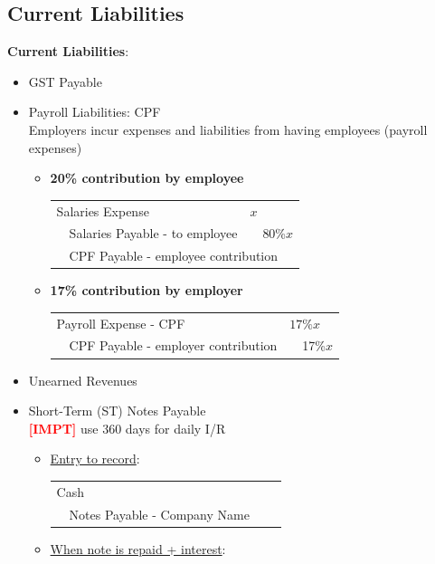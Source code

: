 \documentclass{article}
\newcommand{\impt}[0]{\textcolor{red}{\textbf{[IMPT] }}}
\begin{document}
\begin{multicols}{2}
\subsection{Current Liabilities}
\textbf{Current Liabilities}:
\begin{itemize}
	\item GST Payable
	\item Payroll Liabilities: CPF\\
	Employers incur expenses and liabilities from having employees (payroll expenses)
	\begin{itemize}
		\item \textbf{20\% contribution by employee}\vspace{0.5em}\\
		\begin{tabular}{llll}
			\multicolumn{2}{l}{Salaries Expense}& \multicolumn{2}{l}{$x$} \\
			& Salaries Payable - to employee& &80\%$x$\\
			&\multicolumn{3}{l}{CPF Payable - employee contribution}\\
		\end{tabular}\vspace{0.5em}
		\item \textbf{17\% contribution by employer}\vspace{0.5em}\\
		\begin{tabular}{llll}
			\multicolumn{2}{l}{Payroll Expense - CPF}& \multicolumn{2}{l}{$17\%x$} \\
			& CPF Payable - employer contribution& &17\%$x$
		\end{tabular}\vspace{0.5em}
	\end{itemize}
    \item Unearned Revenues
    \item Short-Term (ST) Notes Payable\\
    \impt use 360 days for daily I/R
    \begin{itemize}
    	\item \underline{Entry to record}:
    	\vspace{0.5em}\\
    	\begin{tabular}{llll}
    		\multicolumn{4}{l}{Cash}\\
    		& Notes Payable - Company Name& &
    	\end{tabular}\vspace{0.5em}
    \item \underline{When note is repaid + interest}:\vspace{0.5em}\\

\end{itemize}
\end{itemize}
\end{multicols}
\end{document}

